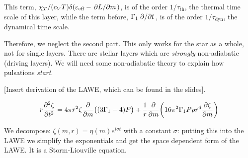 \documentclass[main.tex]{subfiles}
\begin{document}
This term,  \( \chi_T / (c_V T) \delta (\varepsilon_{\text{eff}} - \pdv*{L}{m} )\), is of the order \(1/\tau_{\text{th}}\), the thermal time scale of this layer, while the term before, \(\Gamma_1 \pdv*{}{t} (\delta \rho / \rho)\), is of the order \(1/\tau_{\text{dyn}}\), the dynamical time scale.

Therefore, we neglect the second part.
This only works for the star as a whole, not for single layers.
There are stellar layers which are \emph{strongly} non-adiabatic (driving layers). We will need some non-adiabatic theory to explain how pulsations \emph{start}.

[Insert derivation of the LAWE, which can be found in the slides].

\begin{equation}
  r \pdv[2]{\zeta}{t} =
  4 \pi r^2 \zeta \pdv{}{m} \qty((3 \Gamma_1 - 4)P)+
  \frac{1}{r} \pdv{}{m} \qty(16 \pi^2 \Gamma_1 P \rho r^6 \pdv{\zeta}{m} )
\end{equation}

We decompose: \(\zeta(m, r) = \eta(m) e^{i \sigma t}\) with a constant \(\sigma\): putting this into the LAWE we simplify the exponentials and get the space dependent form of the LAWE.
It is a Storm-Liouville equation.
\end{document}
